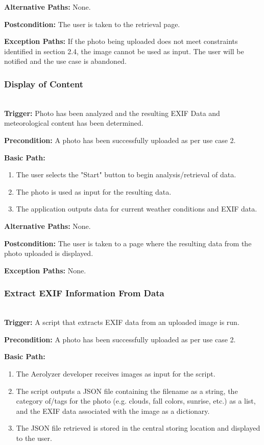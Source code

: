 \documentclass[letterpaper,10pt,draftclsnofoot,onecolumn]{IEEEtran}
\begin{document}
\begin{flushleft}
\textbf{Alternative Paths: }
None.

\textbf{Postcondition: }
The user is taken to the retrieval page.

\textbf{Exception Paths: }
If the photo being uploaded does not meet constraints identified in section 2.4, the image cannot be used as input. The user will be notified and the use case is abandoned.

\bigskip

\subsubsection{Display of Content}  \ \\

\textbf{Trigger: }
Photo has been analyzed and the resulting EXIF Data and meteorological content has been determined.

\textbf{Precondition: }
A photo has been successfully uploaded as per use case 2.

\textbf{Basic Path: }
\begin{enumerate}
	\item The user selects the "Start" button to begin analysis/retrieval of data.
	\item The photo is used as input for the resulting data.
	\item The application outputs data for current weather conditions and EXIF data.
\end{enumerate}

\textbf{Alternative Paths: }
None.

\textbf{Postcondition: }
The user is taken to a page where the resulting data from the photo uploaded is displayed.

\textbf{Exception Paths: }
None.
\bigskip

\subsubsection{Extract EXIF Information From Data}  \ \\

\textbf{Trigger: }
A script that extracts EXIF data from an uploaded image is run.

\textbf{Precondition: }
A photo has been successfully uploaded as per use case 2.

\textbf{Basic Path: }
\begin{enumerate}
	\item The Aerolyzer developer receives images as input for the script.
	\item The script outputs a JSON file containing the filename as a string, the category of/tags for the photo (e.g. clouds, fall colors, sunrise, etc.) as a list, and the EXIF data associated with the image as a dictionary.
	\item The JSON file retrieved is stored in the central storing location and displayed to the user.
\end{enumerate}


\end{flushleft}
\end{document}
